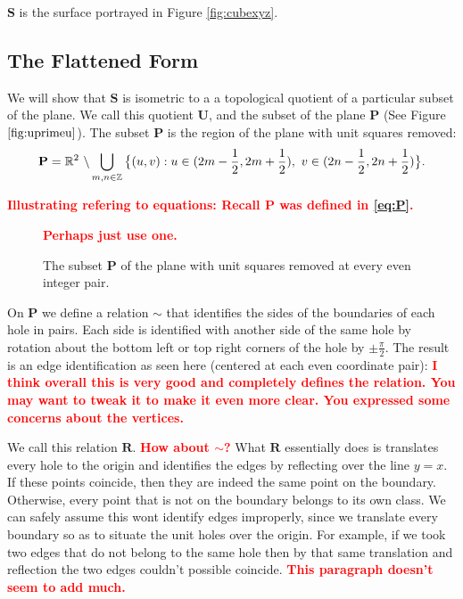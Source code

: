 \documentclass[]{article}
\newcommand{\compat}[1]{\textbf{\textcolor{red}{#1}}}
\begin{document}
\noindent $\mathbf{S}$ is the surface portrayed in Figure \ref{fig:cubexyz}. 

\subsection{The Flattened Form}
We will show that $\mathbf S$ is isometric to a a topological quotient of a particular subset of the plane. We call this quotient $\mathbf{U}$, and the subset of the plane $\mathbf P$ (See Figure $\ref{fig:uprimeu}$).
The subset $\mathbf P$ is the region of the plane with unit squares removed:
\begin{equation}
\label{eq:P}
\mathbf{P} = \mathbb{R}^{2}\text{ }\backslash\bigcup_{m,n \in {\mathbb Z}} \big{\{}(u,v):u\in(2m-\frac{1}{2},2m+\frac{1}{2}),\text{ } v\in(2n-\frac{1}{2},2n+\frac{1}{2})\big{\}}.
\end{equation}

\compat{Illustrating refering to equations: Recall $\mathbf{P}$ was defined in \eqref{eq:P}.}


\begin{figure}[H]
\begin{center}

\end{center}
\caption{The subset $\mathbf P$ of the plane with unit squares removed at every even integer pair.} \compat{Perhaps just use one.}
\label{fig:uprimeu}
\end{figure}

\noindent On $\mathbf P$ we define a relation $\sim$ that identifies the sides of the boundaries of each hole in pairs. Each side is identified with another side of the same hole by rotation about the bottom left or top right corners of the hole by $\pm\frac{\pi}{2}$. The result is an edge identification as seen here (centered at each even coordinate pair): \compat{I think overall this is very good and completely defines the relation. You may want to tweak it to make it even more clear. You expressed some concerns about the vertices.}

\begin{figure}[H]\centering

\end{figure}
\noindent We call this relation $\mathbf{R}$. \compat{How about $\sim$?} What $\mathbf{R}$ essentially does is translates every hole to the origin and identifies the edges by reflecting over the line $y=x$. If these points coincide, then they are indeed the same point on the boundary. Otherwise, every point that is not on the boundary belongs to its own class. We can safely assume this wont identify edges improperly, since we translate every boundary so as to situate the unit holes over the origin. For example, if we took two edges that do not belong to the same hole then by that same translation and reflection the two edges couldn't possible coincide.  \compat{This paragraph doesn't seem to add much.}
\end{document}
